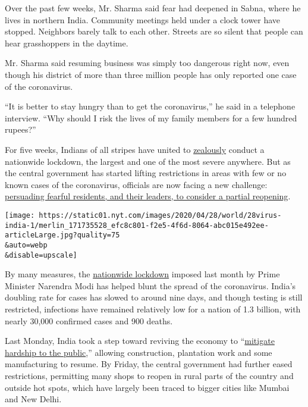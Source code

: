 Over the past few weeks, Mr. Sharma said fear had deepened in Sabna,
where he lives in northern India. Community meetings held under a clock
tower have stopped. Neighbors barely talk to each other. Streets are so
silent that people can hear grasshoppers in the daytime.

Mr. Sharma said resuming business was simply too dangerous right now,
even though his district of more than three million people has only
reported one case of the coronavirus.

``It is better to stay hungry than to get the coronavirus,'' he said in
a telephone interview. ``Why should I risk the lives of my family
members for a few hundred rupees?''

For five weeks, Indians of all stripes have united to
\href{https://www.nytimes.com/2020/04/19/world/asia/india-coronavirus-lockdown.html}{zealously}
conduct a nationwide lockdown, the largest and one of the most severe
anywhere. But as the central government has started lifting restrictions
in areas with few or no known cases of the coronavirus, officials are
now facing a new challenge:
\href{https://indianexpress.com/article/india/kerala-gujarat-set-to-open-shops-maharashtra-punjab-stay-shut-coronavirus-lockdown-6379495/}{persuading
fearful residents, and their leaders, to consider a partial reopening}.

\texttt{[image: https://static01.nyt.com/images/2020/04/28/world/28virus-india-1/merlin\_171735528\_efc8c801-f2e5-4f6d-8064-abc015e492ee-articleLarge.jpg?quality=75\\\&auto=webp\\\&disable=upscale]}

By many measures, the
\href{https://www.nytimes.com/2020/03/24/world/asia/india-coronavirus-lockdown.html}{nationwide
lockdown} imposed last month by Prime Minister Narendra Modi has helped
blunt the spread of the coronavirus. India's doubling rate for cases has
slowed to around nine days, and though testing is still restricted,
infections have remained relatively low for a nation of 1.3 billion,
with nearly 30,000 confirmed cases and 900 deaths.

Last Monday, India took a step toward reviving the economy to
``\href{https://twitter.com/PIBHomeAffairs/status/1250284039048556545}{mitigate
hardship to the public},'' allowing construction, plantation work and
some manufacturing to resume. By Friday, the central government had
further eased restrictions, permitting many shops to reopen in rural
parts of the country and outside hot spots, which have largely been
traced to bigger cities like Mumbai and New Delhi.

